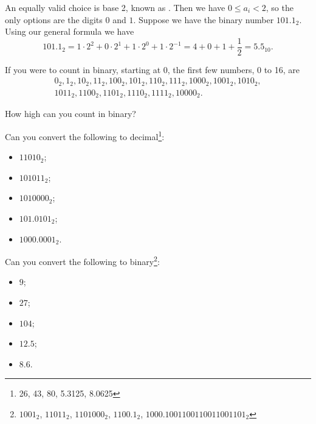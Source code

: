 \documentclass[fleqn]{LectureClass/LectureClass}
\begin{document}
    An equally valid choice is base 2, known as .
    Then we have \(0 \le a_i < 2\), so the only options are the digits \(0\) and \(1\).
    Suppose we have the binary number \(101.1_2\).
    Using our general formula we have
    \begin{equation}
        101.1_2 = 1 \cdot 2^2 + 0 \cdot 2^1 + 1 \cdot 2^0 + 1 \cdot 2^{-1} = 4 + 0 + 1 + \frac{1}{2} = 5.5_{10}.
    \end{equation}
    
    If you were to count in binary, starting at 0, the first few numbers, 0 to 16, are
    \begin{multline}
        0_2, 1_2, 10_2, 11_2, 100_2, 101_2, 110_2, 111_2, 1000_2, 1001_2, 1010_2,\\
        1011_2, 1100_2, 1101_2, 1110_2, 1111_2, 10000_2.
    \end{multline}
    
    \begin{problem}{}{}
        How high can you count in binary?
        
        Can you convert the following to decimal\footnote{26, 43, 80, 5.3125, 8.0625}:
        \begin{itemize}
            \item \(11010_2\);
            \item \(101011_2\);
            \item \(1010000_2\);
            \item \(101.0101_2\);
            \item \(1000.0001_2\).
        \end{itemize}
        Can you convert the following to binary\footnote{\(1001_2\), \(11011_2\), \(1101000_2\), \(1100.1_2\), \(1000.1001100110011001101_2\)}:
        \begin{itemize}
            \item \(9\);
            \item \(27\);
            \item \(104\);
            \item \(12.5\);
            \item \(8.6\).
        \end{itemize}
    \end{problem}
    
\end{document}
